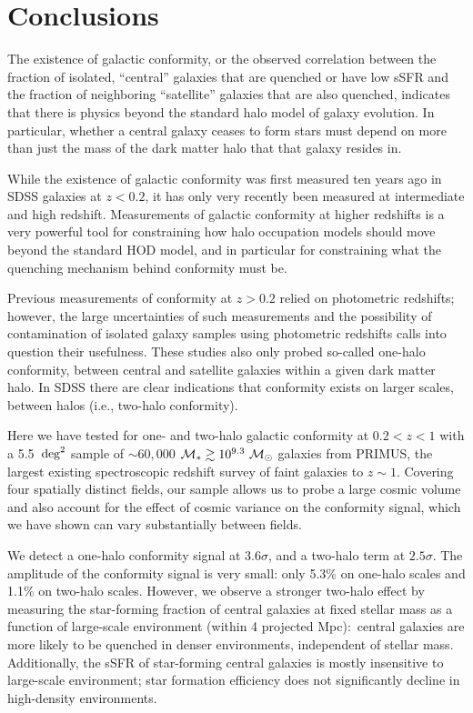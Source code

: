 
\section{Conclusions}\label{sec:conclusion}

The existence of galactic conformity, or the observed correlation between 
the fraction of isolated, ``central'' galaxies that are quenched or have 
low sSFR and the fraction of neighboring ``satellite'' galaxies that are also
quenched, indicates that there is physics beyond the standard halo model 
of galaxy evolution.  In particular, whether a central galaxy ceases to 
form stars must depend on more than just the mass of the dark matter halo 
that that galaxy resides in.  

While the existence of galactic conformity was first measured ten years ago
in SDSS galaxies at $z<0.2$, it has only very recently been measured at 
intermediate and high redshift.  
Measurements of galactic conformity at higher redshifts is a very powerful 
tool for constraining how halo occupation models should move beyond the 
standard HOD model, and in particular for constraining what the quenching 
mechanism behind conformity must be.  

Previous measurements of conformity at $z>0.2$ relied on photometric 
redshifts; however, the large uncertainties of such measurements and the 
possibility of contamination of isolated galaxy samples using photometric
redshifts calls into question their usefulness.  These studies also only
probed so-called one-halo conformity, between central and satellite galaxies
within a given dark matter halo.  In SDSS there are clear indications that
conformity exists on larger scales, between halos (i.e., two-halo conformity).

Here we have tested for one- and two-halo galactic conformity at ${0.2<z<1}$ 
with a 5.5~$\degsq$ sample of $\sim60,000$ ${\mstar\gtrsim10^{9.3}~\msun}$ 
galaxies from PRIMUS, the largest existing spectroscopic redshift survey 
of faint galaxies to ${z\sim1}$.
Covering four spatially distinct fields, our sample allows us to probe a large 
cosmic volume and also account for the effect of cosmic variance on the conformity signal,
which we have shown can vary substantially between fields. 

We detect a one-halo conformity signal at $3.6\sigma$, and a two-halo term at $2.5\sigma$.  
The amplitude of the conformity signal is very small: only 5.3\% on one-halo 
scales and 1.1\% on two-halo scales.
However, we observe a stronger two-halo effect by measuring the star-forming fraction of central galaxies at fixed stellar mass as a function of large-scale environment (within 4 projected Mpc):~central galaxies are more likely to be quenched in denser environments, independent of stellar mass.
Additionally, the sSFR of star-forming central galaxies is mostly insensitive to large-scale environment; star formation efficiency does not significantly decline in high-density environments.


